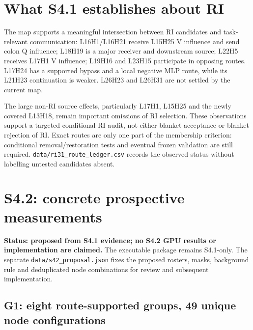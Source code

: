 \documentclass[11pt,a4paper]{article}
\newcommand{\file}[1]{\nolinkurl{#1}}
\begin{document}
\section{What S4.1 establishes about RI}
The map supports a meaningful intersection between RI candidates and task-relevant communication: L16H1/L16H21 receive L15H25 V influence and send colon Q influence; L18H19 is a major receiver and downstream source; L22H5 receives L17H1 V influence; L19H16 and L23H15 participate in opposing routes. L17H24 has a supported bypass and a local negative MLP route, while its L21H23 continuation is weaker. L26H23 and L26H31 are not settled by the current map.

The large non-RI source effects, particularly L17H1, L15H25 and the newly covered L13H18, remain important omissions of RI selection. These observations support a targeted conditional RI audit, not either blanket acceptance or blanket rejection of RI. Exact routes are only one part of the membership criterion: conditional removal/restoration tests and eventual frozen validation are still required. \file{data/ri31_route_ledger.csv} records the observed status without labelling untested candidates absent.

\section{S4.2: concrete prospective measurements}
\label{sec:s42}
\textbf{Status: proposed from S4.1 evidence; no S4.2 GPU results or implementation are claimed.} The executable package remains S4.1-only. The separate \file{data/s42_proposal.json} fixes the proposed rosters, masks, background rule and deduplicated node combinations for review and subsequent implementation.

\subsection{G1: eight route-supported groups, 49 unique node configurations}
\begin{table}[htbp]\centering\footnotesize

\caption{Proposed G1 groups. Outgoing rows list receiver heads; incoming rows list source heads. All \emph{group members} are patched at the colon. Source fact masks in outgoing labels identify the evidence motivating the group, not a replacement of the receiver mask. Counts are unique singles, full group and group-minus-one within each row, before cross-row deduplication.}
\label{tab:groups}
\end{table}
\end{document}
